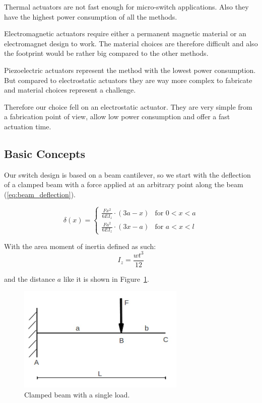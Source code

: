 Thermal actuators are not fast enough for micro-switch applications. 
Also they have the highest power consumption of all the methods.

Electromagnetic actuators require either a permanent magnetic material or an electromagnet design to work.
The material choices are therefore difficult and also the footprint would be rather big compared to the other methods.

Piezoelectric actuators represent the method with the lowest power consumption.
But compared to electrostatic actuators they are way more complex to fabricate and material choices represent a challenge.\cite{klaasse2002piezoelectric}

Therefore our choice fell on an electrostatic actuator.
They are very simple from a fabrication point of view, allow low power consumption and offer a fast actuation time.

\subsection{Basic Concepts}
\label{sec:basic_concepts}

Our switch design is based on a beam cantilever, so we start with the deflection of a clamped beam with a force applied at an arbitrary point along the beam (\ref{eq:beam_deflection}).

\begin{equation}
    \delta(x) = \begin{cases} \frac{Fx^2}{6EI_z} \cdot (3a-x) & \mbox{for } 0 < x < a \\
                              \frac{Fa^2}{6EI_z} \cdot (3x-a) & \mbox{for } a < x < l
                \end{cases}
    \label{eq:beam_deflection}
\end{equation}


With the area moment of inertia defined as such:
\begin{equation}
	I_z = \frac{wt^3}{12}
	\label{eq:area_moment_of_inertia}
\end{equation}

and the distance $a$ like it is shown in Figure~\ref{fig:cantilever_beam}.

\begin{figure}[h]
	\centering
	\includegraphics[width=8cm]{fig/cantilever_beam_single_load.png}
    \caption{Clamped beam with a single load.}
\label{fig:cantilever_beam}
\end{figure}

